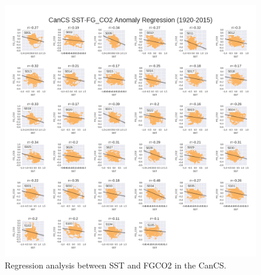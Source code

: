\documentclass[12pt]{article}
\begin{document}
\clearpage
\begin{figure}[!h]
	\centering
	\includegraphics[width=\linewidth]{../../figs/cancs/regression_plots/smoothed_FGCO2_vs_smoothed_SSTregression_subplots.png}
	\caption{Regression analysis between SST and FGCO2 in the CanCS.}
	\label{fig:CanCS-SST-regressions}
\end{figure}
\end{document}
